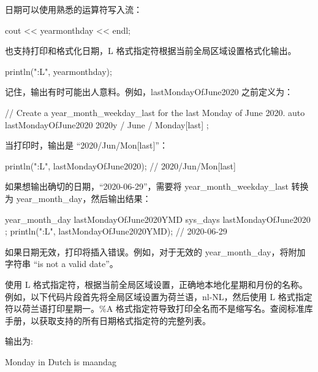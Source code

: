 
日期可以使用熟悉的运算符写入流：

\begin{cpp}
cout << yearmonthday << endl;
\end{cpp}

也支持打印和格式化日期，L 格式指定符根据当前全局区域设置格式化输出。

\begin{cpp}
println("{:L}", yearmonthday);
\end{cpp}

记住，输出有时可能出人意料。例如，lastMondayOfJune2020 之前定义为：

\begin{cpp}
// Create a year_month_weekday_last for the last Monday of June 2020.
auto lastMondayOfJune2020 { 2020y / June / Monday[last] };
\end{cpp}

当打印时，输出是 “2020/Jun/Mon[last]”：

\begin{cpp}
println("{:L}", lastMondayOfJune2020); // 2020/Jun/Mon[last]
\end{cpp}

如果想输出确切的日期，“2020-06-29”，需要将 year\_month\_weekday\_last 转换为 year\_month\_day，然后输出结果：

\begin{cpp}
year_month_day lastMondayOfJune2020YMD { sys_days { lastMondayOfJune2020 } };
println("{:L}", lastMondayOfJune2020YMD); // 2020-06-29
\end{cpp}

如果日期无效，打印将插入错误。例如，对于无效的 year\_month\_day，将附加字符串 “is not a valid date”。

使用 L 格式指定符，根据当前全局区域设置，正确地本地化星期和月份的名称。例如，以下代码片段首先将全局区域设置为荷兰语，nl-NL，然后使用 L 格式指定符以荷兰语打印星期一。\%A 格式指定符导致打印全名而不是缩写名。查阅标准库手册，以获取支持的所有日期格式指定符的完整列表。


输出为:

\begin{shell}
Monday in Dutch is maandag
\end{shell}


